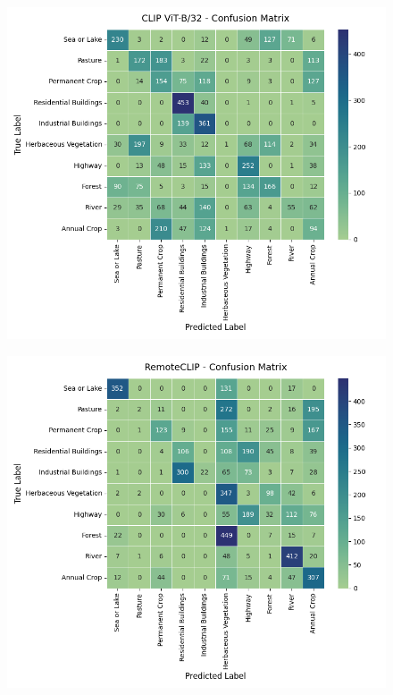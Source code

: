\documentclass[a4paper, twoside, english]{sapthesis} %
\begin{document}
\vspace{0.5cm}

\noindent
\begin{minipage}{\textwidth}
    \centering

    \begin{subfigure}[t]{0.48\textwidth}
      \centering
      \includegraphics[width=\linewidth]{img/EuroSAT_CLIP_32_cm.png}
    \end{subfigure}
    \hfill
    \begin{subfigure}[t]{0.48\textwidth}
      \centering
      \includegraphics[width=\linewidth]{img/EuroSAT_RemoteCLIP_32_cm.png}
    \end{subfigure}


\end{minipage}
\end{document}
